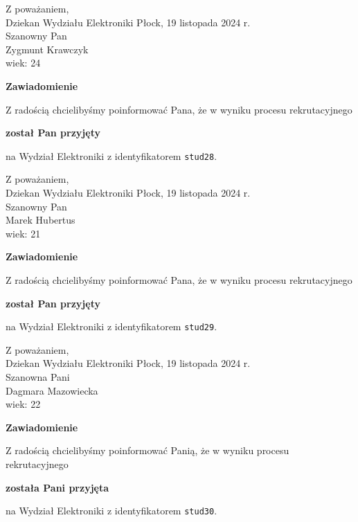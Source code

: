 \documentclass[12pt,a4paper]{article}
\begin{document}
\noindent
Z poważaniem,\\
Dziekan
Wydziału Elektroniki
\newpage
\hfill Płock, 19 listopada 2024 r.\\ 
\noindent 
Szanowny Pan \\
Zygmunt Krawczyk \\
wiek: 24

\bigskip

\begin{center}
{\Large\textbf{Zawiadomienie}}
\end{center}
\bigskip
Z radością chcielibyśmy poinformować Pana, że w wyniku procesu rekrutacyjnego
\begin{center}
\textsf{\textbf{został Pan przyjęty}} 
\end{center}
na Wydział Elektroniki z identyfikatorem \verb|stud28|.
\vspace{2cm}

\noindent
Z poważaniem,\\
Dziekan
Wydziału Elektroniki
\newpage
\hfill Płock, 19 listopada 2024 r.\\ 
\noindent 
Szanowny Pan \\
Marek Hubertus \\
wiek: 21

\bigskip

\begin{center}
{\Large\textbf{Zawiadomienie}}
\end{center}
\bigskip
Z radością chcielibyśmy poinformować Pana, że w wyniku procesu rekrutacyjnego
\begin{center}
\textsf{\textbf{został Pan przyjęty}} 
\end{center}
na Wydział Elektroniki z identyfikatorem \verb|stud29|.
\vspace{2cm}

\noindent
Z poważaniem,\\
Dziekan
Wydziału Elektroniki
\newpage
\hfill Płock, 19 listopada 2024 r.\\ 
\noindent 
Szanowna Pani \\
Dagmara Mazowiecka \\
wiek: 22

\bigskip

\begin{center}
{\Large\textbf{Zawiadomienie}}
\end{center}
\bigskip
Z radością chcielibyśmy poinformować Panią, że w wyniku procesu rekrutacyjnego
\begin{center}
\textsf{\textbf{została Pani przyjęta}} 
\end{center}
na Wydział Elektroniki z identyfikatorem \verb|stud30|.
\vspace{2cm}
\end{document}
